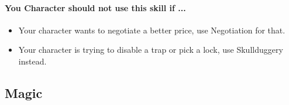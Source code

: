 \begin{multicols}{2}
\paragraph{You Character should not use this skill if ...}
\begin{itemize}
    \item Your character wants to negotiate a better price, use Negotiation for that.
    \item Your character is trying to disable a trap or pick a lock, use Skullduggery instead.
\end{itemize}

\end{multicols}
\hrulefill
\subsection{Magic}
